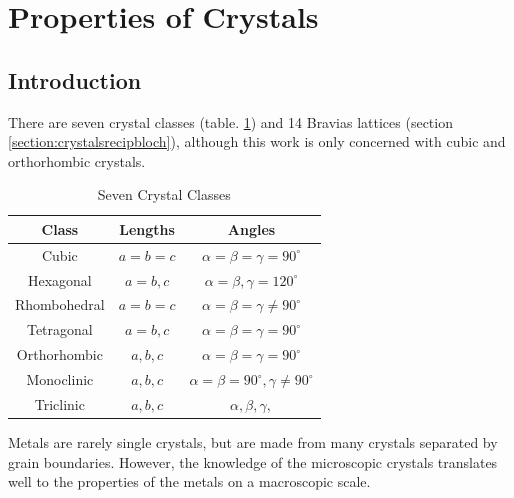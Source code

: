 
\section{Properties of Crystals}

\subsection{Introduction}

There are seven crystal classes (table. \ref{table:crystalclasses}) and 14 Bravias lattices (section \ref{section:crystalsrecipbloch}), although this work is only concerned with cubic and \gls{orthorhombic} crystals.    

\begin{table}[h]
\begin{center}
\renewcommand{\arraystretch}{1.2}
\begin{tabular}{c c c}
\hline\hline
Class & Lengths & Angles \\
\hline\hline
Cubic & $a = b = c$ & $ \alpha = \beta = \gamma = 90^{\circ}$ \\
Hexagonal & $a = b, c $ & $ \alpha = \beta, \gamma = 120^{\circ}$ \\
Rhombohedral & $a = b = c $ & $ \alpha = \beta = \gamma \neq 90^{\circ}$ \\
Tetragonal & $a = b, c $ & $ \alpha = \beta = \gamma = 90^{\circ}$ \\
Orthorhombic & $a, b, c $ & $ \alpha = \beta = \gamma = 90^{\circ}$ \\
Monoclinic & $a, b, c $ & $ \alpha = \beta = 90^{\circ}, \gamma \neq 90^{\circ} $ \\
Triclinic & $a, b, c $ & $ \alpha, \beta, \gamma, $ \\
\hline\hline
\end{tabular}
\caption{Seven Crystal Classes}
\label{table:crystalclasses}
\end{center}
\end{table}

Metals are rarely single crystals, but are made from many crystals separated by grain boundaries.  However, the knowledge of the microscopic crystals translates well to the properties of the metals on a macroscopic scale.

